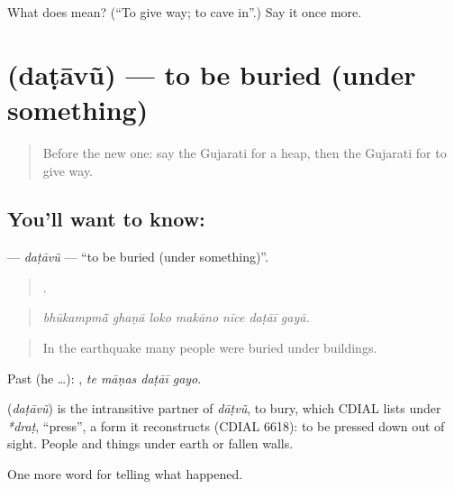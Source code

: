 \begin{tcolorbox}[breakable,colback=teal!4,colframe=teal!35!black,title={Before you move on}]
What does  mean? (\textquotedblleft{}To give way; to cave in\textquotedblright{}.) Say it once more.
\end{tcolorbox}
\section[\texorpdfstring{\gu{દટાવું} (daṭāvũ)}{દટાવું (daṭāvũ)}]{ (daṭāvũ) — to be buried (under something)}

\label{lesson:GU-C305-datavu}



\begin{quote}
Before the new one: say the Gujarati for a heap, then the Gujarati for to give way.
\end{quote}

\subsection*{You'll want to know: }
\textbf{} — \emph{daṭāvũ} — \textquotedblleft{}to be buried (under something)\textquotedblright{}.

\begin{quote}
      .
\end{quote}

\begin{quote}
\emph{bhūkampmā̃ ghaṇā loko makāno nīce daṭāī gayā.}
\end{quote}

\begin{quote}
In the earthquake many people were buried under buildings.
\end{quote}

Past (he …):    , \emph{te māṇas daṭāī gayo}.

\begin{cousinweb}
\textbf{} (\emph{daṭāvũ}) is the intransitive partner of \emph{dāṭvũ}, to bury, which CDIAL lists under \emph{*draṭ}, \textquotedblleft{}press\textquotedblright{}, a form it reconstructs (CDIAL 6618): to be pressed down out of sight. People and things \textbf{  } under earth or fallen walls.
\end{cousinweb}

\begin{grammarlens}[title={What you've built}]
One more word for telling what happened.
\end{grammarlens}

